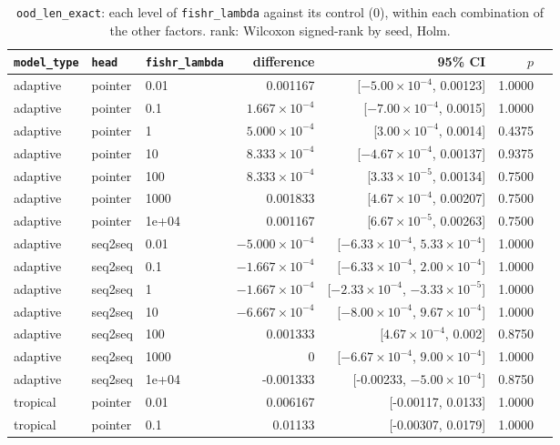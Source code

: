 \documentclass[10pt]{article}
\begin{document}
{\small
\begin{longtable}{lllrrrl}
\caption{\texttt{ood\_len\_exact}: each level of \texttt{fishr\_lambda} against its control (0), within each combination of the other factors. rank: Wilcoxon signed-rank by seed, Holm.}\label{tab:control-ood_len_exact}\\
\toprule
\texttt{model\_type} & \texttt{head} & \texttt{fishr\_lambda} & difference & 95\% CI & $p$ & \\
\midrule
\endhead
adaptive & pointer & 0.01 & 0.001167 & [$-5.00\times10^{-4}$, 0.00123] & 1.0000 & \\
adaptive & pointer & 0.1 & $1.667\times10^{-4}$ & [$-7.00\times10^{-4}$, 0.0015] & 1.0000 & \\
adaptive & pointer & 1 & $5.000\times10^{-4}$ & [$3.00\times10^{-4}$, 0.0014] & 0.4375 & \\
adaptive & pointer & 10 & $8.333\times10^{-4}$ & [$-4.67\times10^{-4}$, 0.00137] & 0.9375 & \\
adaptive & pointer & 100 & $8.333\times10^{-4}$ & [$3.33\times10^{-5}$, 0.00134] & 0.7500 & \\
adaptive & pointer & 1000 & 0.001833 & [$4.67\times10^{-4}$, 0.00207] & 0.7500 & \\
adaptive & pointer & 1e+04 & 0.001167 & [$6.67\times10^{-5}$, 0.00263] & 0.7500 & \\
adaptive & seq2seq & 0.01 & $-5.000\times10^{-4}$ & [$-6.33\times10^{-4}$, $5.33\times10^{-4}$] & 1.0000 & \\
adaptive & seq2seq & 0.1 & $-1.667\times10^{-4}$ & [$-6.33\times10^{-4}$, $2.00\times10^{-4}$] & 1.0000 & \\
adaptive & seq2seq & 1 & $-1.667\times10^{-4}$ & [$-2.33\times10^{-4}$, $-3.33\times10^{-5}$] & 1.0000 & \\
adaptive & seq2seq & 10 & $-6.667\times10^{-4}$ & [$-8.00\times10^{-4}$, $9.67\times10^{-4}$] & 1.0000 & \\
adaptive & seq2seq & 100 & 0.001333 & [$4.67\times10^{-4}$, 0.002] & 0.8750 & \\
adaptive & seq2seq & 1000 & 0 & [$-6.67\times10^{-4}$, $9.00\times10^{-4}$] & 1.0000 & \\
adaptive & seq2seq & 1e+04 & -0.001333 & [-0.00233, $-5.00\times10^{-4}$] & 0.8750 & \\
tropical & pointer & 0.01 & 0.006167 & [-0.00117, 0.0133] & 1.0000 & \\
tropical & pointer & 0.1 & 0.01133 & [-0.00307, 0.0179] & 1.0000 & \\

\end{longtable}}
\end{document}
